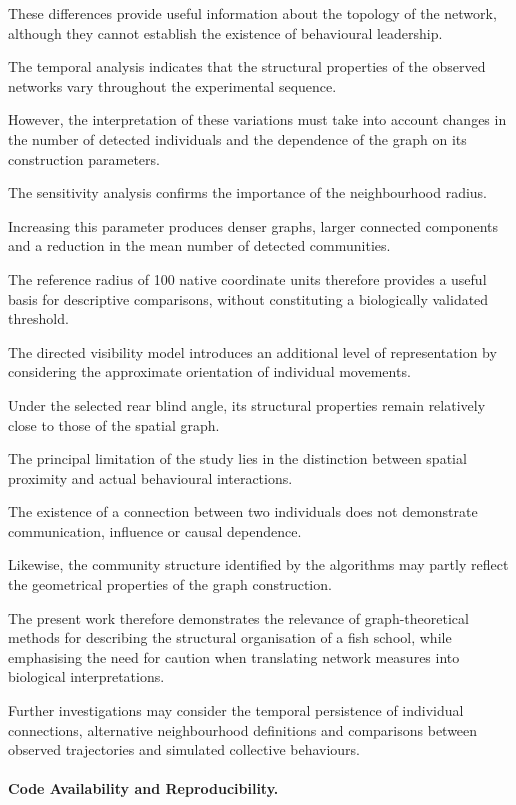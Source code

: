 \documentclass[10pt,a4paper]{article}
\newcommand{\esp}{\vspace*{2\bigskipamount}}
\begin{document}
These differences provide useful
information about the topology
of the network, although they
cannot establish the existence
of behavioural leadership.

The temporal analysis indicates
that the structural properties
of the observed networks vary
throughout the experimental sequence.

However, the interpretation of
these variations must take into
account changes in the number
of detected individuals and
the dependence of the graph
on its construction parameters.

The sensitivity analysis confirms
the importance of the neighbourhood
radius.

Increasing this parameter produces
denser graphs, larger connected
components and a reduction in the
mean number of detected communities.

The reference radius of 100 native
coordinate units therefore provides
a useful basis for descriptive
comparisons, without constituting
a biologically validated threshold.

The directed visibility model
introduces an additional level
of representation by considering
the approximate orientation of
individual movements.

Under the selected rear blind
angle, its structural properties
remain relatively close to those
of the spatial graph.

The principal limitation of
the study lies in the distinction
between spatial proximity and
actual behavioural interactions.

The existence of a connection
between two individuals does
not demonstrate communication,
influence or causal dependence.

Likewise, the community
structure identified by the
algorithms may partly reflect
the geometrical properties
of the graph construction.

The present work therefore
demonstrates the relevance
of graph-theoretical methods
for describing the structural
organisation of a fish school,
while emphasising the need
for caution when translating
network measures into
biological interpretations.

Further investigations may
consider the temporal persistence
of individual connections,
alternative neighbourhood
definitions and comparisons
between observed trajectories
and simulated collective
behaviours.

\esp 

\paragraph{Code Availability and Reproducibility.}
\end{document}
